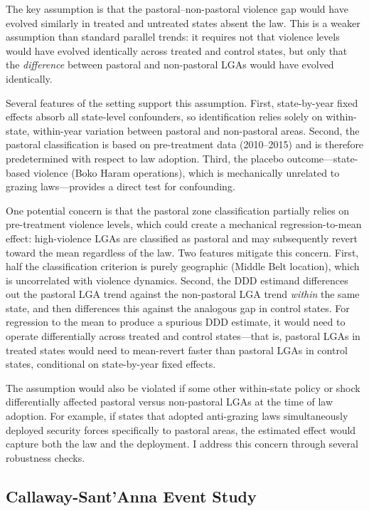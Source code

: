 \documentclass[12pt]{article}
\begin{document}
The key assumption is that the pastoral--non-pastoral violence gap would have evolved similarly in treated and untreated states absent the law. This is a weaker assumption than standard parallel trends: it requires not that violence levels would have evolved identically across treated and control states, but only that the \textit{difference} between pastoral and non-pastoral LGAs would have evolved identically.

Several features of the setting support this assumption. First, state-by-year fixed effects absorb all state-level confounders, so identification relies solely on within-state, within-year variation between pastoral and non-pastoral areas. Second, the pastoral classification is based on pre-treatment data (2010--2015) and is therefore predetermined with respect to law adoption. Third, the placebo outcome---state-based violence (Boko Haram operations), which is mechanically unrelated to grazing laws---provides a direct test for confounding.

One potential concern is that the pastoral zone classification partially relies on pre-treatment violence levels, which could create a mechanical regression-to-mean effect: high-violence LGAs are classified as pastoral and may subsequently revert toward the mean regardless of the law. Two features mitigate this concern. First, half the classification criterion is purely geographic (Middle Belt location), which is uncorrelated with violence dynamics. Second, the DDD estimand differences out the pastoral LGA trend against the non-pastoral LGA trend \textit{within} the same state, and then differences this against the analogous gap in control states. For regression to the mean to produce a spurious DDD estimate, it would need to operate differentially across treated and control states---that is, pastoral LGAs in treated states would need to mean-revert faster than pastoral LGAs in control states, conditional on state-by-year fixed effects.

The assumption would also be violated if some other within-state policy or shock differentially affected pastoral versus non-pastoral LGAs at the time of law adoption. For example, if states that adopted anti-grazing laws simultaneously deployed security forces specifically to pastoral areas, the estimated effect would capture both the law and the deployment. I address this concern through several robustness checks.

\subsection{Callaway-Sant'Anna Event Study}
\end{document}
